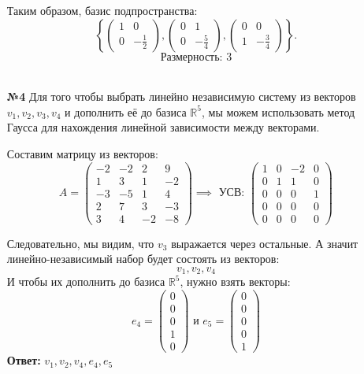 \documentclass[a4paper]{article}
\newcommand{\mat}[1]{\begin{pmatrix} #1 \end{pmatrix}}
\newcommand{\RR}{\mathbb{R}}
\begin{document}
\begin{enumerate}
    Таким образом, базис подпространства:
    $$
    \left\{ \begin{pmatrix} 1 & 0 \\ 0 & -\frac{1}{2} \end{pmatrix}, \begin{pmatrix} 0 & 1 \\ 0 & -\frac{5}{4} \end{pmatrix}, \begin{pmatrix} 0 & 0 \\ 1 & -\frac{3}{4} \end{pmatrix} \right\}.
    $$
    $$\text{Размерность: } 3$$\\


    \item[\textbf{№4}]Для того чтобы выбрать линейно независимую систему из векторов $ v_1, v_2, v_3, v_4 $ и дополнить её до базиса $ \mathbb{R}^5 $, мы можем использовать метод Гаусса для нахождения линейной зависимости между векторами.

    Составим матрицу из векторов:
    $$
    A = \begin{pmatrix}
    -2 & -2 & 2 & 9 \\
    1 & 3 & 1 & -2 \\
    -3 & -5 & 1 & 4 \\
    2 & 7 & 3 & -3 \\
    3 & 4 & -2 & -8
    \end{pmatrix} 
    \implies \text{ УСВ: }
    \begin{pmatrix}
        1 & 0 & -2 & 0 \\
        0 & 1 & 1 & 0 \\
        0 & 0 & 0 & 1 \\
        0 & 0 & 0 & 0 \\
        0 & 0 & 0 & 0
    \end{pmatrix}
    $$

    Следовательно, мы видим, что $v_3$ выражается через остальные. А значит линейно-независимый набор будет состоять из векторов:
    $$v_1, v_2, v_4$$
    И чтобы их дополнить до базиса $\RR^5$, нужно взять векторы:
    $$e_4 = \mat{0\\0\\0\\1\\0} \text{ и } e_5 = \mat{0\\0\\0\\0\\1}$$
    \textbf{Ответ: } $v_1, v_2, v_4, e_4, e_5$


\end{enumerate}
\end{document}
